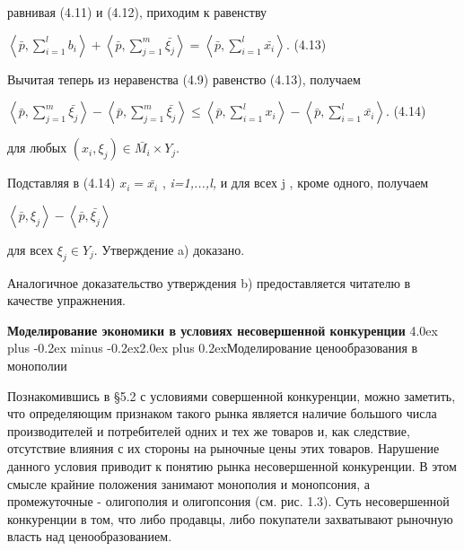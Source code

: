 \documentclass[12pt, 4paper]{book}
\makeatletter
\renewcommand{\section}{\@startsection{section}{1}{1pt}%
	{4.0ex plus -0.2ex minus -0.2ex}{2.0ex plus 0.2ex}{\centering\bf}}%
\makeatother
\begin{document}
{\begin{center}
\end{center}
равнивая (4.11) и (4.12), приходим к равенству
\begin{center}
$\left\langle \bar{p},\sum\limits_{i=1}^{l} b_i\right\rangle + \left\langle \bar{p}, \sum\limits_{j=1}^{m} \bar{\xi_j} \right\rangle = \left\langle \bar{p}, \sum\limits_{i=1}^l \bar{x_{i}}\right\rangle$.  (4.13)
\end{center}
Вычитая теперь из неравенства (4.9) равенство (4.13), получаем
\begin{center}
$\left\langle \bar{p}, \sum\limits_{j=1}^{m} \bar{\xi_j} \right\rangle - \left\langle \bar{p}, \sum\limits_{j=1}^{m} \bar{\xi_j} \right\rangle \leq  \left\langle \bar{p}, \sum\limits_{i=1}^l x_{i}\right\rangle - \left\langle \bar{p}, \sum\limits_{i=1}^l \bar{x_{i}}\right\rangle $. (4.14)
\end{center}
для любых $(x_i,\xi_j) \in \bar{M_i} \times Y_j$.
\par

Подставляя в (4.14) $x_i = \bar{x_i}$ , \textit{i=1,...,l,} и  для всех j , кроме одного, получаем
\begin{center}
$\left\langle \bar{p},\xi_j\right\rangle - \left\langle \bar{p},\bar{\xi_j} \right\rangle$
\end{center}
для всех $\xi_j \in Y_j$. Утверждение a) доказано.
\par

Аналогичное доказательство утверждения b) предоставляется читателю в качестве упражнения.
\newpage
\begin{center}
\textbf{Моделирование экономики в условиях несовершенной конкуренции}
\section{Моделирование ценообразования в монополии}
\end{center}
\par

Познакомившись в §5.2 с условиями совершенной конкуренции, можно заметить, что определяющим признаком такого рынка является наличие большого числа производителей и потребителей одних и тех же товаров и, как следствие, отсутствие влияния с их стороны на рыночные цены этих товаров. Нарушение данного условия приводит к понятию рынка несовершенной конкуренции. В этом смысле крайние положения занимают монополия и монопсония, а промежуточные - олигополия и олигопсония (см. рис. 1.3). Суть несовершенной конкуренции в том, что либо продавцы, либо покупатели захватывают рыночную власть над ценообразованием.
\par

}
\end{document}
